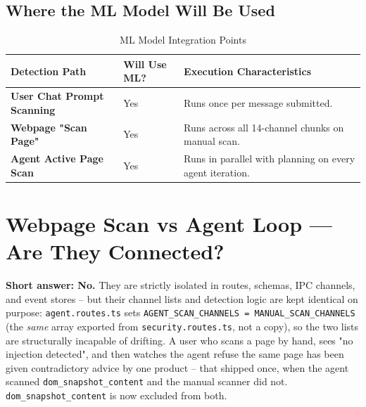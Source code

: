\documentclass[11pt,a4paper]{article}
\begin{document}
\subsection{Where the ML Model Will Be Used}

\begin{table}[H]
\centering
\small
\begin{tabularx}{\textwidth}{BXX}
\toprule
\textbf{Detection Path} & \textbf{Will Use ML?} & \textbf{Execution Characteristics} \\
\midrule
\textbf{User Chat Prompt Scanning} & Yes & Runs once per message submitted. \\
\textbf{Webpage "Scan Page"} & Yes & Runs across all 14-channel chunks on manual scan. \\
\textbf{Agent Active Page Scan} & Yes & Runs in parallel with planning on every agent iteration. \\
\bottomrule
\end{tabularx}
\caption{ML Model Integration Points}
\end{table}

\section{Webpage Scan vs Agent Loop --- Are They Connected?}
\label{sec:isolation}

\textbf{Short answer: No.} They are strictly isolated in routes, schemas, IPC channels, and event stores -- but their channel lists and detection logic are kept identical on purpose: \texttt{agent.routes.ts} sets \texttt{AGENT\_SCAN\_CHANNELS = MANUAL\_SCAN\_CHANNELS} (the \emph{same} array exported from \texttt{security.routes.ts}, not a copy), so the two lists are structurally incapable of drifting. A user who scans a page by hand, sees "no injection detected", and then watches the agent refuse the same page has been given contradictory advice by one product -- that shipped once, when the agent scanned \texttt{dom\_snapshot\_content} and the manual scanner did not. \texttt{dom\_snapshot\_content} is now excluded from both.
\end{document}
